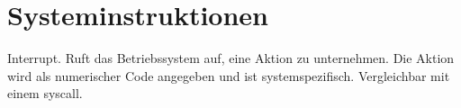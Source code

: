 \section{Systeminstruktionen}

\glqq Interrupt\grqq.
Ruft das Betriebssystem auf, eine Aktion zu unternehmen. 
Die Aktion wird als numerischer Code angegeben und ist systemspezifisch.
Vergleichbar mit einem \glqq syscall\grqq.

